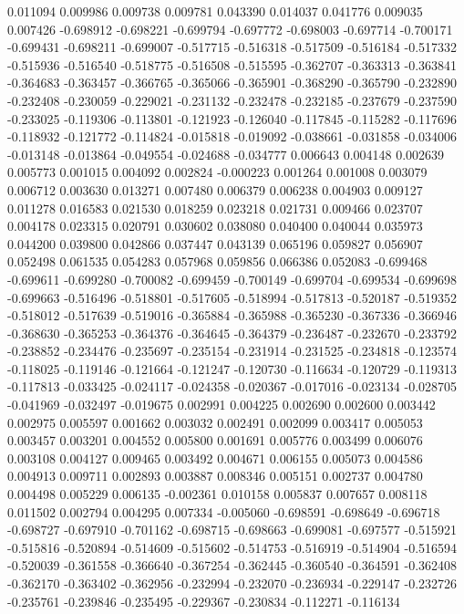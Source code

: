 0.011094
0.009986
0.009738
0.009781
0.043390
0.014037
0.041776
0.009035
0.007426
-0.698912
-0.698221
-0.699794
-0.697772
-0.698003
-0.697714
-0.700171
-0.699431
-0.698211
-0.699007
-0.517715
-0.516318
-0.517509
-0.516184
-0.517332
-0.515936
-0.516540
-0.518775
-0.516508
-0.515595
-0.362707
-0.363313
-0.363841
-0.364683
-0.363457
-0.366765
-0.365066
-0.365901
-0.368290
-0.365790
-0.232890
-0.232408
-0.230059
-0.229021
-0.231132
-0.232478
-0.232185
-0.237679
-0.237590
-0.233025
-0.119306
-0.113801
-0.121923
-0.126040
-0.117845
-0.115282
-0.117696
-0.118932
-0.121772
-0.114824
-0.015818
-0.019092
-0.038661
-0.031858
-0.034006
-0.013148
-0.013864
-0.049554
-0.024688
-0.034777
0.006643
0.004148
0.002639
0.005773
0.001015
0.004092
0.002824
-0.000223
0.001264
0.001008
0.003079
0.006712
0.003630
0.013271
0.007480
0.006379
0.006238
0.004903
0.009127
0.011278
0.016583
0.021530
0.018259
0.023218
0.021731
0.009466
0.023707
0.004178
0.023315
0.020791
0.030602
0.038080
0.040400
0.040044
0.035973
0.044200
0.039800
0.042866
0.037447
0.043139
0.065196
0.059827
0.056907
0.052498
0.061535
0.054283
0.057968
0.059856
0.066386
0.052083
-0.699468
-0.699611
-0.699280
-0.700082
-0.699459
-0.700149
-0.699704
-0.699534
-0.699698
-0.699663
-0.516496
-0.518801
-0.517605
-0.518994
-0.517813
-0.520187
-0.519352
-0.518012
-0.517639
-0.519016
-0.365884
-0.365988
-0.365230
-0.367336
-0.366946
-0.368630
-0.365253
-0.364376
-0.364645
-0.364379
-0.236487
-0.232670
-0.233792
-0.238852
-0.234476
-0.235697
-0.235154
-0.231914
-0.231525
-0.234818
-0.123574
-0.118025
-0.119146
-0.121664
-0.121247
-0.120730
-0.116634
-0.120729
-0.119313
-0.117813
-0.033425
-0.024117
-0.024358
-0.020367
-0.017016
-0.023134
-0.028705
-0.041969
-0.032497
-0.019675
0.002991
0.004225
0.002690
0.002600
0.003442
0.002975
0.005597
0.001662
0.003032
0.002491
0.002099
0.003417
0.005053
0.003457
0.003201
0.004552
0.005800
0.001691
0.005776
0.003499
0.006076
0.003108
0.004127
0.009465
0.003492
0.004671
0.006155
0.005073
0.004586
0.004913
0.009711
0.002893
0.003887
0.008346
0.005151
0.002737
0.004780
0.004498
0.005229
0.006135
-0.002361
0.010158
0.005837
0.007657
0.008118
0.011502
0.002794
0.004295
0.007334
-0.005060
-0.698591
-0.698649
-0.696718
-0.698727
-0.697910
-0.701162
-0.698715
-0.698663
-0.699081
-0.697577
-0.515921
-0.515816
-0.520894
-0.514609
-0.515602
-0.514753
-0.516919
-0.514904
-0.516594
-0.520039
-0.361558
-0.366640
-0.367254
-0.362445
-0.360540
-0.364591
-0.362408
-0.362170
-0.363402
-0.362956
-0.232994
-0.232070
-0.236934
-0.229147
-0.232726
-0.235761
-0.239846
-0.235495
-0.229367
-0.230834
-0.112271
-0.116134
